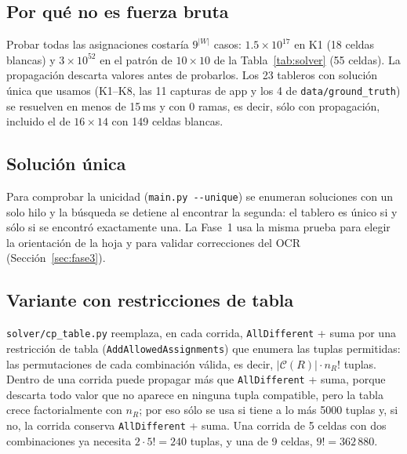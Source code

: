\documentclass[conference,a4paper]{IEEEtran}
\begin{document}
\subsection{Por qué no es fuerza bruta}
Probar todas las asignaciones costaría $9^{|W|}$ casos: $1.5\times10^{17}$ en K1 (18 celdas blancas) y $3\times10^{52}$ en el patrón de
$10\times10$ de la Tabla~\ref{tab:solver} (55 celdas). La propagación descarta valores antes de probarlos. Los 23 tableros con solución
única que usamos (K1--K8, las 11 capturas de app y los 4 de \texttt{data/ground\_truth}) se resuelven en menos de 15\,ms y con 0 ramas,
es decir, sólo con propagación, incluido el de $16\times14$ con 149 celdas blancas.

\subsection{Solución única}
Para comprobar la unicidad (\texttt{main.py -{}-unique}) se enumeran soluciones con un solo hilo y la búsqueda se detiene al encontrar la
segunda: el tablero es único si y sólo si se encontró exactamente una. La Fase~1 usa la misma prueba para elegir la orientación de la
hoja y para validar correcciones del OCR (Sección~\ref{sec:fase3}).

\subsection{Variante con restricciones de tabla}
\texttt{solver/cp\_table.py} reemplaza, en cada corrida, \texttt{AllDifferent} + suma por una restricción de tabla
(\texttt{AddAllowedAssignments}) que enumera las tuplas permitidas: las permutaciones de cada combinación válida, es decir,
$|\mathcal{C}(R)|\cdot n_R!$ tuplas. Dentro de una corrida puede propagar más que \texttt{AllDifferent} + suma, porque descarta todo
valor que no aparece en ninguna tupla compatible, pero la tabla crece factorialmente con $n_R$; por eso sólo se usa si tiene a lo más 5000 tuplas y, si no, la
corrida conserva \texttt{AllDifferent} + suma. Una corrida de 5 celdas con dos combinaciones ya necesita $2\cdot5!=240$ tuplas, y una de
9 celdas, $9!=362\,880$.
\end{document}
